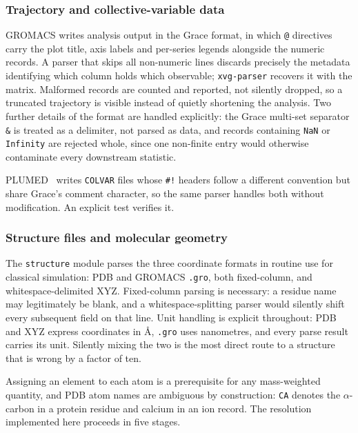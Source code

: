 \documentclass[11pt,a4paper]{article}
\begin{document}
\subsubsection{Trajectory and collective-variable data}

GROMACS writes analysis output in the Grace format, in which \texttt{@}
directives carry the plot title, axis labels and per-series legends alongside the
numeric records. A parser that skips all non-numeric lines discards precisely the
metadata identifying which column holds which observable; \texttt{xvg-parser}
recovers it with the matrix. Malformed records are counted and reported, not
silently dropped, so a truncated trajectory is visible instead of quietly
shortening the analysis. Two further details of the
format are handled explicitly: the Grace multi-set separator \texttt{\&} is
treated as a delimiter, not parsed as data, and records containing
\texttt{NaN} or \texttt{Infinity} are rejected whole, since one non-finite entry
would otherwise contaminate every downstream statistic.

PLUMED~\cite{tribello2014} writes \texttt{COLVAR} files whose \texttt{\#!}
headers follow a different convention but share Grace's comment character, so the
same parser handles both without modification. An explicit test verifies it.

\subsubsection{Structure files and molecular geometry}

The \texttt{structure} module parses the three coordinate formats in routine use
for classical simulation: PDB and GROMACS \texttt{.gro}, both fixed-column, and
whitespace-delimited XYZ. Fixed-column parsing is necessary:
a residue name may legitimately be blank, and a whitespace-splitting parser would
silently shift every subsequent field on that line. Unit handling is explicit
throughout: PDB and XYZ express coordinates in \si{\angstrom}, \texttt{.gro}
uses nanometres, and every parse result carries its unit. Silently mixing the
two is the most direct route to a structure that is wrong by a factor of ten.

Assigning an element to each atom is a prerequisite for any mass-weighted
quantity, and PDB atom names are ambiguous by construction: \texttt{CA} denotes
the $\alpha$-carbon in a protein residue and calcium in an ion record. The
resolution implemented here proceeds in five stages.
\end{document}
